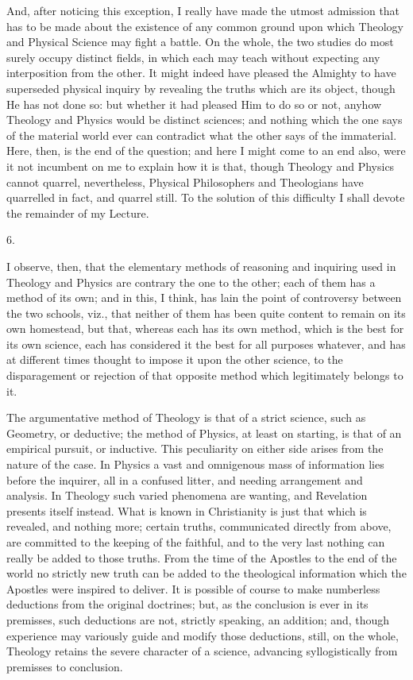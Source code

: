 And, after noticing this exception, I really have made the utmost
admission that has to be made about the existence of any common ground
upon which Theology and Physical Science may fight a battle. On the
whole, the two studies do most surely occupy distinct fields, in which
each may teach without expecting any interposition from the other. It
might indeed have pleased the Almighty to have superseded physical
inquiry by revealing the truths which are its object, though He has
not done so: but whether it had pleased Him to do so or not, anyhow
Theology and Physics would be distinct sciences; and nothing which the
one says of the material world ever can contradict what the other says
of the immaterial. Here, then, is the end of the question; and here I
might come to an end also, were it not incumbent on me to explain how
it is that, though Theology and Physics cannot quarrel, nevertheless,
Physical Philosophers and Theologians have quarrelled in fact, and
quarrel still. To the solution of this difficulty I shall devote the
remainder of my Lecture.

6.

I observe, then, that the elementary methods of reasoning and
inquiring used in Theology and Physics are contrary the one to the
other; each of them has a method of its own; and in this, I think, has
lain the point of controversy between the two schools, viz., that
neither of them has been quite content to remain on its own
homestead, but that, whereas each has its own method, which is the
best for its own science, each has considered it the best for all
purposes whatever, and has at different times thought to impose it
upon the other science, to the disparagement or rejection of that
opposite method which legitimately belongs to it.

The argumentative method of Theology is that of a strict science,
such as Geometry, or deductive; the method of Physics, at least on
starting, is that of an empirical pursuit, or inductive. This
peculiarity on either side arises from the nature of the case. In
Physics a vast and omnigenous mass of information lies before the
inquirer, all in a confused litter, and needing arrangement and
analysis. In Theology such varied phenomena are wanting, and
Revelation presents itself instead. What is known in Christianity is
just that which is revealed, and nothing more; certain truths,
communicated directly from above, are committed to the keeping of the
faithful, and to the very last nothing can really be added to those
truths. From the time of the Apostles to the end of the world no
strictly new truth can be added to the theological information which
the Apostles were inspired to deliver. It is possible of course to
make numberless deductions from the original doctrines; but, as the
conclusion is ever in its premisses, such deductions are not, strictly
speaking, an addition; and, though experience may variously guide and
modify those deductions, still, on the whole, Theology retains the
severe character of a science, advancing syllogistically from
premisses to conclusion.

